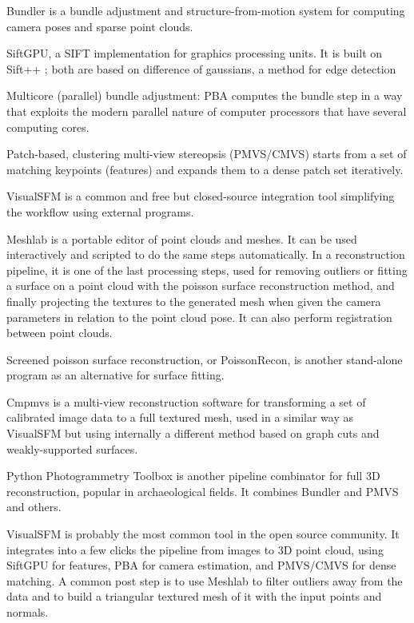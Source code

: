 Bundler is a bundle adjustment and structure-from-motion system for computing camera poses and sparse point clouds. \cite{snavely2006photo}

SiftGPU, a SIFT implementation for graphics processing units. \cite{changchang2007siftgpu} It is built on Sift++ \cite{vedaldi2011sift++}; both are based on difference of gaussians, a method for edge detection \cite{marr1980theory}

Multicore (parallel) bundle adjustment: PBA computes the bundle step in a way that exploits the modern parallel nature of computer processors that have several computing cores. \cite{wu2011multicore}

Patch-based, clustering multi-view stereopsis (PMVS/CMVS) starts from a set of matching keypoints (features) and expands them to a dense patch set iteratively. \cite{furukawa2010accurate,furukawa2012patch}

VisualSFM \cite{wu2013towards} is a common and free but closed-source integration tool simplifying the workflow using external programs.

Meshlab \cite{meshlab} is a portable editor of point clouds and meshes.
It can be used interactively and scripted to do the same steps automatically.
In a reconstruction pipeline, it is one of the last processing steps, used for removing outliers or fitting a surface on a point cloud with the poisson surface reconstruction method, and finally projecting the textures to the generated mesh when given the camera parameters in relation to the point cloud pose.
It can also perform registration between point clouds.

Screened poisson surface reconstruction, or PoissonRecon, is another stand-alone program as an alternative for surface fitting. \cite{kazhdan2013screened}

Cmpmvs is a multi-view reconstruction software for transforming a set of calibrated image data to a full textured mesh, used in a similar way as VisualSFM but using internally a different method based on graph cuts and weakly-supported surfaces.
\cite{jancosek2011multi}

Python Photogrammetry Toolbox is another pipeline combinator for full 3D reconstruction, popular in archaeological fields. It combines Bundler and PMVS and others. \cite{moulon2011python}

VisualSFM is probably the most common tool in the open source community.
It integrates into a few clicks the pipeline from images to 3D point cloud, using SiftGPU for features, PBA for camera estimation, and PMVS/CMVS for dense matching.
A common post step is to use Meshlab to filter outliers away from the data and to build a triangular textured mesh of it with the input points and normals.

